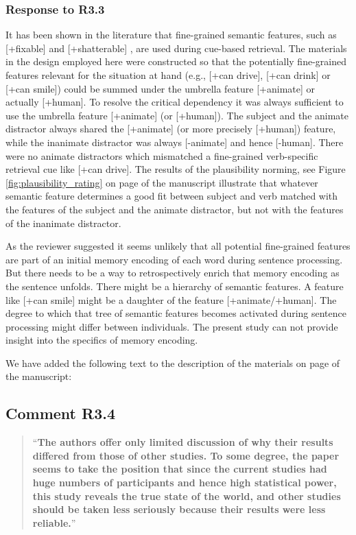 \documentclass[12pt]{article}
\begin{document}
\subsubsection*{Response to R3.3}
It has been shown in the literature that fine-grained semantic features, such as [+fixable] \citep{vandyke_mcelree06} and [+shatterable] \citep{cunnings_sturt_2018retrieval}, are used during cue-based retrieval. The materials in the design employed here were constructed so that the potentially fine-grained features relevant for the situation at hand (e.g., [+can drive], [+can drink] or [+can smile]) could be summed under the umbrella feature [+animate] or actually [+human]. To resolve the critical dependency it was always sufficient to use the umbrella feature [+animate] (or [+human]). The subject and the animate distractor always shared the [+animate] (or more precisely [+human]) feature, while the inanimate distractor was always [-animate] and hence [-human]. There were no animate distractors which mismatched a fine-grained verb-specific retrieval cue like [+can drive]. The results of the plausibility norming, see Figure \ref{fig:plausibility_rating} on page \pageref{fig:plausibility_rating} of the manuscript illustrate that whatever semantic feature determines a good fit between subject and verb matched with the features of the subject and the animate distractor, but not with the features of the inanimate distractor. 

As the reviewer suggested it seems unlikely that all potential fine-grained features are part of an initial memory encoding of each word during sentence processing. But there needs to be a way to retrospectively enrich that memory encoding as the sentence unfolds. There might be a hierarchy of semantic features. A feature like [+can smile] might be a daughter of the feature [+animate/+human]. The degree to which that tree of semantic features becomes activated during sentence processing might differ between individuals. The present study can not provide insight into the specifics of memory encoding. 

We have added the following text to the description of the materials on page \pageref{semantic_features_encoding} of the manuscript:


\subsection*{Comment R3.4}
\begin{quote}
``\textbf{The authors offer only limited discussion of why their results differed from those of other studies. To some degree, the paper seems to take the position that since the current studies had huge numbers of participants and hence high statistical power, this study reveals the true state of the world, and other studies should be taken less seriously because their results were less reliable.}''
\end{quote}
\end{document}
